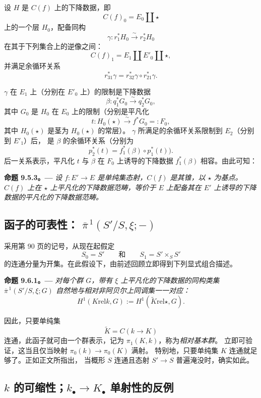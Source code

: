 设 \(H\) 是 \(C(f)\) 上的下降数据，即
\[
  C(f)_0=E_0\amalg\star
\]
上的一个层 \(H_0\)，配备同构
\[
  \gamma:r_1^*H_0\xrightarrow{\sim}r_2^*H_0
\]
在其于下列集合上的逆像之间：
\[
  C(f)_1=E_1\amalg E'_0\amalg\star,
\]
并满足余循环关系
\[
  r_{31}^*\gamma=r_{32}^*\gamma\circ r_{21}^*\gamma.
\]

\(\gamma\) 在 \(E_1\) 上（分别在 \(E'_0\) 上）的限制是下降数据
\[
  \beta:q_1^*G_0\xrightarrow{\sim}q_2^*G_0,
\]
其中 \(G_0\) 是 \(H_0\) 在 \(E_0\) 上的限制（分别是平凡化
\[
  t:H_0(\star)\xrightarrow{\sim}f^*G_0=:F_0,
\]
其中 \(H_0(\star)\) 是茎为 \(H_0(\star)\) 的常层）。
\(\gamma\) 所满足的余循环关系限制到 \(E_2\)（分别到 \(E'_1\)）后，
是 \(\beta\) 的余循环关系（分别为
\[
  p_2^*(t)=f_1^*(\beta)\circ p_1^*(t)).
\]
后一关系表示，平凡化 \(t\) 与 \(\beta\) 在 \(F_0\) 上诱导的下降数据
\(f_1^*(\beta)\) 相容。由此可知：

\par\medskip\noindent{}\textbf{命题 9.5.3。---}\enspace
\emph{设 \(f:E'\to E\) 是单纯集态射，\(C(f)\) 是其锥，以 \(\star\) 为基点。
\(C(f)\) 上在 \(\star\) 上平凡化的下降数据范畴，等价于 \(E\) 上配备其在
\(E'\) 上诱导的下降数据的平凡化的下降数据范畴。}

\subsection{函子的可表性：
\(\overline{\pi}^{\,1}(S'/S,\xi;{-})\)}

采用第 90 页的记号，从现在起假定
\[
  S_0=S'
  \qquad\text{和}\qquad
  S_1=S'\times_S S'
\]
的连通分量为开集。在此假设下，由前述回顾立即得到下列显式组合描述。

\par\medskip\noindent{}\textbf{命题 9.6.1。---}\enspace
\emph{对每个群 \(G\)，带有 \(\xi\) 上平凡化的下降数据的同构类集
\(\overline{\pi}^{\,1}(S'/S,\xi;G)\) 自然地与相对非阿贝尔上同调集一一对应：}
\[
  H^1(K\mathbin{\mathrm{rel}}k,G)
  :=H^1(\widetilde K\mathbin{\mathrm{rel}}\star,G).
\]

因此，只要单纯集
\[
  \widetilde K=C(k\to K)
\]
连通，此函子就可由一个群表示，记为 \(\pi_1(K,k)\)，称为\emph{相对基本群}。
立即可验证，这当且仅当映射 \(\pi_0(k)\to\pi_0(K)\) 满射。
特别地，只要单纯集 \(K\) 连通就足够了。正如正文所指出，
当概形 \(S\) 连通且态射 \(S'\to S\) 普遍淹没时，确实如此。

\subsection{\(k\) 的可缩性；\(k_\bullet\to K_\bullet\) 单射性的反例}

